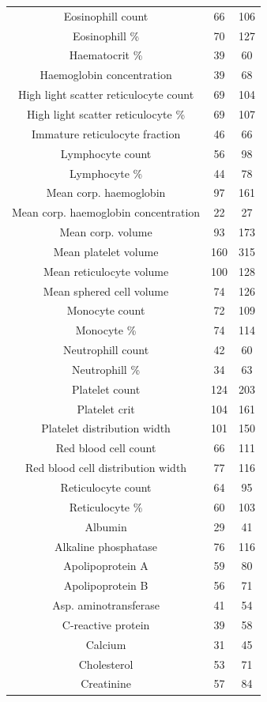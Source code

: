 \begin{small}
\begin{longtable}[h!]{|c|c|c|}
Eosinophill count & 66 & 106 \\
Eosinophill \% & 70 & 127 \\
Haematocrit \% & 39 & 60 \\
Haemoglobin concentration & 39 & 68 \\
High light scatter reticulocyte count & 69 & 104 \\
High light scatter reticulocyte \% & 69 & 107 \\
Immature reticulocyte fraction & 46 & 66 \\
Lymphocyte count & 56 & 98 \\
Lymphocyte \% & 44 & 78 \\
Mean corp. haemoglobin & 97 & 161 \\
Mean corp. haemoglobin concentration & 22 & 27 \\
Mean corp. volume & 93 & 173 \\
Mean platelet volume & 160 & 315 \\
Mean reticulocyte volume & 100 & 128 \\
Mean sphered cell volume & 74 & 126 \\
Monocyte count & 72 & 109 \\
Monocyte \% & 74 & 114 \\
Neutrophill count & 42 & 60 \\
Neutrophill \% & 34 & 63 \\
Platelet count & 124 & 203 \\
Platelet crit & 104 & 161 \\
Platelet distribution width & 101 & 150 \\
Red blood cell count & 66 & 111 \\
Red blood cell distribution width & 77 & 116 \\
Reticulocyte count & 64 & 95 \\
Reticulocyte \% & 60 & 103 \\
Albumin & 29 & 41 \\
Alkaline phosphatase & 76 & 116 \\
Apolipoprotein A & 59 & 80 \\
Apolipoprotein B & 56 & 71 \\
Asp. aminotransferase & 41 & 54 \\
C-reactive protein & 39 & 58 \\
Calcium & 31 & 45 \\
Cholesterol & 53 & 71 \\
Creatinine & 57 & 84 \\

\end{longtable}
\end{small}
